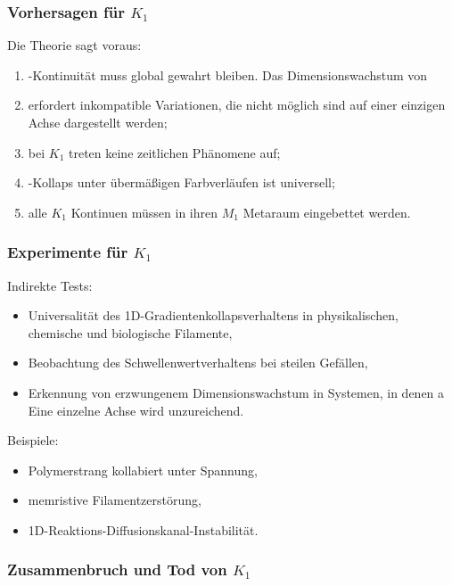 \subsubsection{Vorhersagen für \texorpdfstring{$K_1$}{K_1}}

Die Theorie sagt voraus:
\begin{enumerate}
    Die \item-Kontinuität muss global gewahrt bleiben.
    Das Dimensionswachstum von \item erfordert inkompatible Variationen, die nicht möglich sind
          auf einer einzigen Achse dargestellt werden;
    \item bei $K_1$ treten keine zeitlichen Phänomene auf;
    \item-Kollaps unter übermäßigen Farbverläufen ist universell;
    \item alle $K_1$ Kontinuen müssen in ihren $M_1$ Metaraum eingebettet werden.
\end{enumerate}

\subsubsection{Experimente für \texorpdfstring{$K_1$}{K_1}}

Indirekte Tests:
\begin{itemize}
    \item Universalität des 1D-Gradientenkollapsverhaltens in physikalischen,
          chemische und biologische Filamente,
    \item Beobachtung des Schwellenwertverhaltens bei steilen Gefällen,
    \item Erkennung von erzwungenem Dimensionswachstum in Systemen, in denen a
          Eine einzelne Achse wird unzureichend.
\end{itemize}

Beispiele:
\begin{itemize}
    \item Polymerstrang kollabiert unter Spannung,
    \item memristive Filamentzerstörung,
    \item 1D-Reaktions-Diffusionskanal-Instabilität.
\end{itemize}

\subsubsection{Zusammenbruch und Tod von \texorpdfstring{$K_1$}{K_1}}

